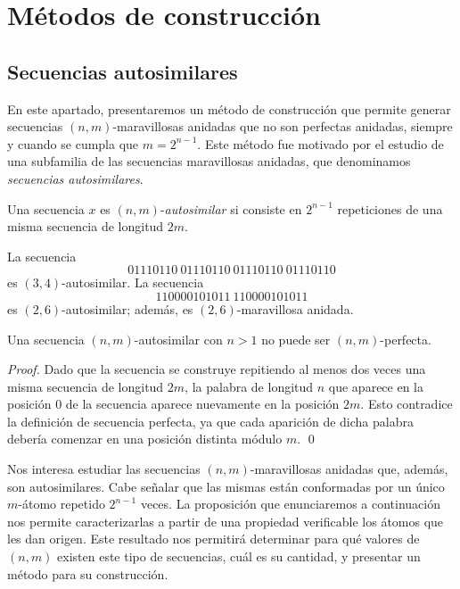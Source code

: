 \documentclass[11pt]{article}
\begin{document}



\section{Métodos de construcción}

\subsection{Secuencias autosimilares}

En este apartado, presentaremos un método de construcción que permite generar
secuencias $(n,m)$-maravillosas anidadas que no son perfectas anidadas, siempre
y cuando se cumpla que $m = 2^{n - 1}$.
Este método fue motivado por el estudio de una subfamilia de las secuencias
maravillosas anidadas, que denominamos \emph{secuencias autosimilares}.

\begin{definition}
	Una secuencia $x$ es $(n,m)$-\emph{autosimilar} si consiste en $2^{n-1}$
	repeticiones de una misma secuencia de longitud $2m$.
\end{definition}

\begin{example}
	La secuencia \[ 01110110\ 01110110\ 01110110\ 01110110 \] es
	$(3,4)$-autosimilar.
	La secuencia \[ 110000101011 \ 110000101011 \] es $(2,6)$-autosimilar; además,
	es $(2,6)$-maravillosa anidada.
\end{example}

\begin{proposition} \label{proposition:autosimilar-cannot-be-np}
	Una secuencia $(n,m)$-autosimilar con $n > 1$ no puede ser $(n,m)$-perfecta.
\end{proposition}

\begin{proof}
	Dado que la secuencia se construye repitiendo al menos dos veces una misma
	secuencia de longitud $2m$, la palabra de longitud $n$ que aparece en la
	posición $0$ de la secuencia aparece nuevamente en la posición $2m$.
	Esto contradice la definición de secuencia perfecta, ya que cada aparición de
	dicha palabra debería comenzar en una posición distinta módulo $m$.
	\qed
\end{proof}

Nos interesa estudiar las secuencias $(n,m)$-maravillosas anidadas que, además,
son autosimilares.
Cabe señalar que las mismas están conformadas por un único $m$-átomo repetido
$2^{n-1}$ veces.
La proposición que enunciaremos a continuación nos permite caracterizarlas a
partir de una propiedad verificable los átomos que les dan origen.
Este resultado nos permitirá determinar para qué valores de $(n,m)$ existen
este tipo de secuencias, cuál es su cantidad, y presentar un método para su
construcción.
\end{document}
